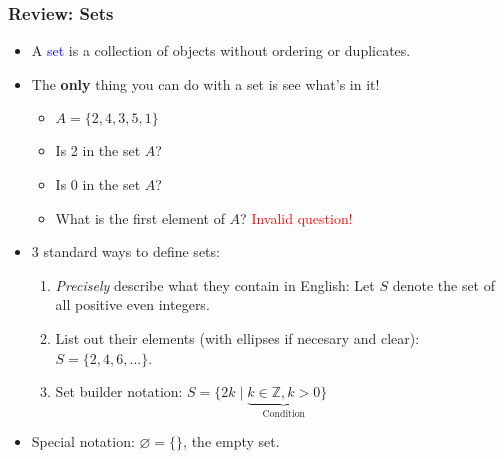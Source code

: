\documentclass{beamer}
\let\emptyset\varnothing
\newcommand{\xmark}{\ding{55}}%
\begin{document}
\begin{frame}
  \frametitle{Review: Sets}
    \begin{itemize}
      \item A \textcolor{blue}{set} is a collection of objects without ordering or duplicates. \pause
      \item The {\bf only} thing you can do with a set is see what's in it! \pause
      \begin{itemize}
        \item $A = \{2, 4, 3, 5, 1\}$ \pause
        \item Is 2 in the set $A$? \pause \checkmark \pause
        \item Is 0 in the set $A$? \pause \xmark \pause
        \item What is the first element of $A$? \pause \textcolor{red}{Invalid question!} \pause
      \end{itemize}
      
      \item 3 standard ways to define sets: \pause
      \begin{enumerate}
        \item \textit{Precisely} describe what they contain in English: Let $S$ denote the set of all positive even integers. \pause
        \item List out their elements (with ellipses if necesary and clear): $S = \{2, 4, 6, ...\}$. \pause
        \item Set builder notation: $S = \{2k \mid \underbrace{k \in \mathbb{Z}, k > 0}_{\text{Condition}}\}$ \pause
      \end{enumerate}

      \item Special notation: $\emptyset = \{\}$, the empty set.
    \end{itemize}
\end{frame}
\end{document}
